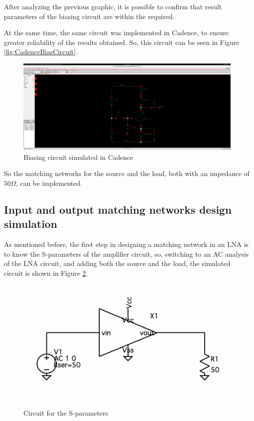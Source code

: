 After analyzing the previous graphic, it is possible to confirm that result parameters of the biasing circuit are within the required.

At the same time, the same circuit was implemented in Cadence, to ensure greater reliability of the results obtained. So, this circuit can be seen in Figure \ref{fig:CadenceBiasCircuit}.

\begin{figure}[H]
    \centering
    \includegraphics*[scale = 0.1]{Images/CadenceBiascircuit.png}
    \caption{Biasing circuit simulated in Cadence}
    \label{fig:CadenceBiasCircuitBiasCircuit}
\end{figure}

So the matching networks for the source and the load, both with an impedance of $50\Omega$, can be implemented.

\subsection{Input and output matching networks design simulation} 

As mentioned before, the first step in designing a matching network in an LNA is to know the S-parameters of the amplifier circuit, so, switching to an AC analysis of the LNA circuit, and adding both the source and the load, the simulated circuit is shown in Figure \ref{fig:SIMS-paramCircuit}.

\begin{figure}[H]
    \centering
    \includegraphics*[scale = 0.3]{Images/S-paramCircuit.png}
    \caption{Circuit for the S-parameters}
    \label{fig:SIMS-paramCircuit}
\end{figure}

